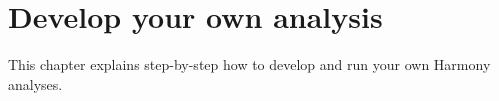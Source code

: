 \chapter{Develop your own analysis}\label{chap:DevelopNewAnalyses}

This chapter explains step-by-step how to develop and run your own Harmony analyses.


%
%		
%
%
%
%
%
